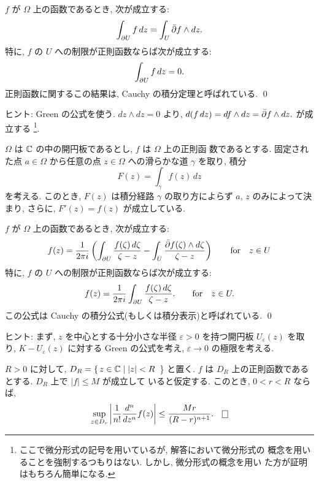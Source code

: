 \documentclass[12pt,twoside]{jarticle}
\begin{document}
\begin{question}
  $f$ が $\Omega$ 上の函数であるとき, 次が成立する:
  \[
    \int_{\partial U} f\,dz = \int_U  {\bar\partial} f \wedge dz.
  \]%
  特に, $f$ の $U$ への制限が正則函数ならば次が成立する:
  \[
    \int_{\partial U} f\,dz = 0.
  \]%
  正則函数に関するこの結果は, Cauchy の積分定理と呼ばれている.
  \qed
\end{question}

\noindent ヒント: Green の公式を使う. $dz\wedge dz = 0$ より, 
\(
  d(f\,dz) = df\wedge dz = {\bar\partial} f \wedge dz.
\) %
が成立する%
\footnote{ここで微分形式の記号を用いているが, 解答において微分形式の
  概念を用いることを強制するつもりはない. しかし, 微分形式の概念を用い
  た方が証明はもちろん簡単になる.}. 
%


\begin{question}[正則函数の不定積分]
  $\Omega$ は ${\mathbb C}$ の中の開円板であるとし, $f$ は $\Omega$ 上の正則函
  数であるとする. 固定された点 $a\in\Omega$ から任意の点 $z\in\Omega$ 
  への滑らかな道 $\gamma$ を取り, 積分
  \[
    F(z) = \int_{\gamma} f(z)\,dz
  \]%
  を考える. このとき, $F(z)$ は積分経路 $\gamma$ の取り方によらず $a$,
  $z$ のみによって決まり, さらに, $F'(z)=f(z)$ が成立している.
\end{question}


\begin{question} 
  $f$ が $\Omega$ 上の函数であるとき, 次が成立する:
  \[
    f(z)
    =
    \frac{1}{2\pi i}
    \left(
      \int_{\partial U} \frac{f(\zeta)\,d\zeta}{\zeta - z}
      -
      \int_U \frac{{\bar\partial} f(\zeta) \wedge d\zeta}{\zeta - z}
    \right)
    \qquad
    \text{for}\quad z\in U
  \]%
  特に, $f$ の $U$ への制限が正則函数ならば次が成立する:
  \[
    f(z)
    =
    \frac{1}{2\pi i}
    \int_{\partial U} \frac{f(\zeta)\,d\zeta}{\zeta - z}.
    \qquad
    \text{for}\quad z\in U.
  \]%
  この公式は Cauchy の積分公式(もしくは積分表示)と呼ばれている. 
  \qed
\end{question}

\noindent ヒント: まず, $z$ を中心とする十分小さな半径 %
$\varepsilon > 0$ を持つ開円板 $U_\varepsilon(z)$ を取り, %
$K - U_\varepsilon(z)$ に対する Green の公式を考え, %
$\varepsilon \to 0$ の極限を考える.

\begin{question}
  $R > 0$ に対して, $D_R = \{\, z\in{\mathbb C} \mid |z| < R$ \,\} と置く. $f$ 
  は $D_R$ 上の正則函数であるとする. $D_R$ 上で $|f|\le M$ が成立して
  いると仮定する. このとき, $0< r < R$ ならば,
  \[
    \sup_{z\in D_r}
      \left| \frac{1}{n!} \frac{d^n}{dz^n} f(z) \right|
    \le
    \frac{M r}{(R - r)^{n+1}}.
  \qed
  \]%
\end{question}
\end{document}
